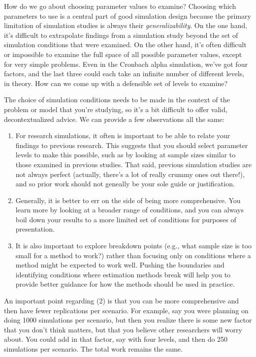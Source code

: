 \documentclass[
]{book}
\begin{document}
How do we go about choosing parameter values to examine?
Choosing which parameters to use is a central part of good simulation design because the primary limitation of simulation studies is always their \emph{generalizability}.
On the one hand, it's difficult to extrapolate findings from a simulation study beyond the set of simulation conditions that were examined. On the other hand, it's often difficult or impossible to examine the full space of all possible parameter values, except for very simple problems. Even in the Cronbach alpha simulation, we've got four factors, and the last three could each take an infinite number of different levels, in theory. How can we come up with a defensible set of levels to examine?

The choice of simulation conditions needs to be made in the context of the problem or model that you're studying, so it's a bit difficult to offer valid, decontextualized advice.
We can provide a few observations all the same:

\begin{enumerate}
\def\labelenumi{\arabic{enumi}.}
\item
  For research simulations, it often is important to be able to relate your findings to previous research. This suggests that you should select parameter levels to make this possible, such as by looking at sample sizes similar to those examined in previous studies. That said, previous simulation studies are not always perfect (actually, there's a lot of really crummy ones out there!), and so prior work should not geneally be your sole guide or justification.
\item
  Generally, it is better to err on the side of being more comprehensive. You learn more by looking at a broader range of conditions, and you can always boil down your results to a more limited set of conditions for purposes of presentation.
\item
  It is also important to explore breakdown points (e.g., what sample size is too small for a method to work?) rather than focusing only on conditions where a method might be expected to work well. Pushing the boundaries and identifying conditions where estimation methods break will help you to provide better guidance for how the methods should be used in practice.
\end{enumerate}

An important point regarding (2) is that you can be more comprehensive and then have fewer replications per scenario.
For example, say you were planning on doing 1000 simulations per scenario, but then you realize there is some new factor that you don't think matters, but that you believe other researchers will worry about.
You could add in that factor, say with four levels, and then do 250 simulations per scenario.
The total work remains the same.
\end{document}

